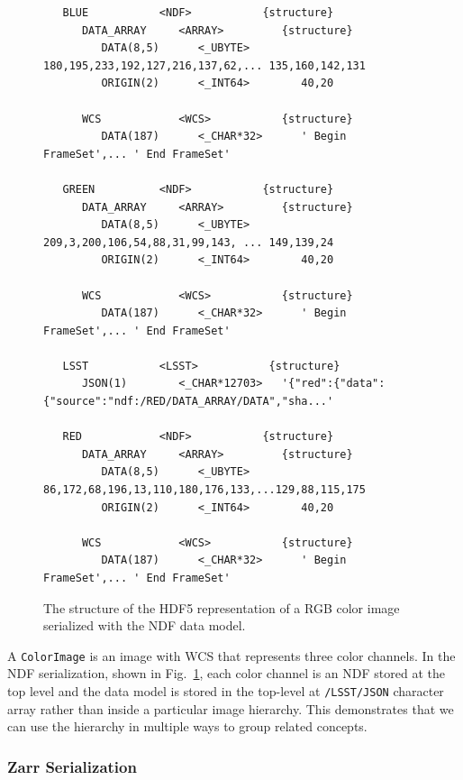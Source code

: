 \begin{figure}[!tbp]
  \begin{center}
    \begin{small}
\begin{verbatim}
   BLUE           <NDF>           {structure}
      DATA_ARRAY     <ARRAY>         {structure}
         DATA(8,5)      <_UBYTE>        180,195,233,192,127,216,137,62,... 135,160,142,131
         ORIGIN(2)      <_INT64>        40,20

      WCS            <WCS>           {structure}
         DATA(187)      <_CHAR*32>      ' Begin FrameSet',... ' End FrameSet'

   GREEN          <NDF>           {structure}
      DATA_ARRAY     <ARRAY>         {structure}
         DATA(8,5)      <_UBYTE>        209,3,200,106,54,88,31,99,143, ... 149,139,24
         ORIGIN(2)      <_INT64>        40,20

      WCS            <WCS>           {structure}
         DATA(187)      <_CHAR*32>      ' Begin FrameSet',... ' End FrameSet'

   LSST           <LSST>           {structure}
      JSON(1)        <_CHAR*12703>   '{"red":{"data":{"source":"ndf:/RED/DATA_ARRAY/DATA","sha...'

   RED            <NDF>           {structure}
      DATA_ARRAY     <ARRAY>         {structure}
         DATA(8,5)      <_UBYTE>        86,172,68,196,13,110,180,176,133,...129,88,115,175
         ORIGIN(2)      <_INT64>        40,20

      WCS            <WCS>           {structure}
         DATA(187)      <_CHAR*32>      ' Begin FrameSet',... ' End FrameSet'
\end{verbatim}
    \end{small}
  \end{center}
  \caption{The structure of the HDF5 representation of a RGB color image serialized with the NDF data model.}
  \label{fig:color-ndf}
\end{figure}

A \texttt{ColorImage} is an image with WCS that represents three color channels.
In the NDF serialization, shown in Fig.~\ref{fig:color-ndf}, each color channel is an NDF stored at the top level and the data model is stored in the top-level at \texttt{/LSST/JSON} character array rather than inside a particular image hierarchy.
This demonstrates that we can use the hierarchy in multiple ways to group related concepts.

\subsubsection{Zarr Serialization}

